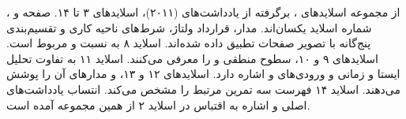 ، از مجموعه اسلایدهای ،
برگرفته از یادداشت‌های  (۲۰۱۱)، اسلایدهای ۳ تا ۱۴.
صفحه و شماره اسلاید یکسان‌اند. مدار، قرارداد ولتاژ، شرط‌های
ناحیه کاری و تقسیم‌بندی پنج‌گانه با تصویر صفحات تطبیق داده شده‌اند.
اسلاید ۸ به نسبت  و  مربوط است.
اسلایدهای ۹ و ۱۰، سطوح منطقی و  را معرفی می‌کنند.
اسلاید ۱۱ به تفاوت تحلیل ایستا و زمانی و ورودی‌های
 و  اشاره دارد. اسلایدهای ۱۲ و ۱۳،
 و مدارهای آن را پوشش می‌دهند.
اسلاید ۱۴ فهرست سه تمرین مرتبط را مشخص می‌کند.
انتساب یادداشت‌های اصلی و اشاره به اقتباس در اسلاید ۲  از همین مجموعه آمده است.
